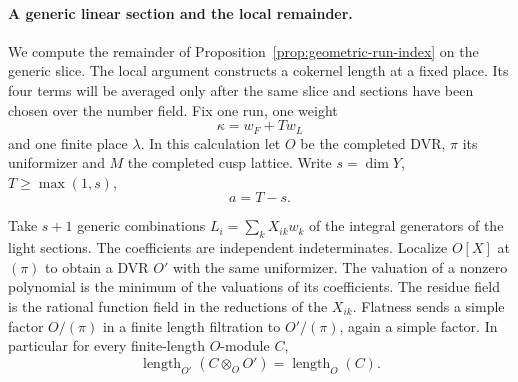 \paragraph{A generic linear section and the local remainder.}
We compute the remainder of Proposition~\ref{prop:geometric-run-index}
on the generic slice. The local argument constructs a cokernel
length at a fixed place. Its four terms will be averaged only
after the same slice and sections have been chosen over the
number field.
\hypertarget{source-run-index-length}{}
Fix one run, one weight 
\[
  \kappa=w_F+Tw_L
\]
 and one finite
place \(\lambda\). In this calculation let \(O\) be the completed
DVR, \(\pi\) its uniformizer and \(M\) the completed cusp lattice.
Write \(s=\dim Y\), \(T\ge\max(1,s)\), 
\[
  a=T-s.
\]

Take \(s+1\)
generic combinations \(L_i=\sum_k X_{ik}w_k\) of the integral
generators of the light sections. The coefficients are independent
indeterminates. Localize \(O[X]\) at \((\pi)\) to obtain a DVR
\(O'\) with the same uniformizer. The valuation of a nonzero
polynomial is the minimum of the valuations of its coefficients.
The residue field is the rational function field in the reductions
of the \(X_{ik}\). Flatness sends a simple factor \(O/(\pi)\) in a finite
length filtration to \(O'/(\pi)\), again a simple factor.
In particular for every finite-length \(O\)-module \(C\),
\[
 \operatorname{length}_{O'}(C\otimes_O O')
   =\operatorname{length}_O(C).
\]

